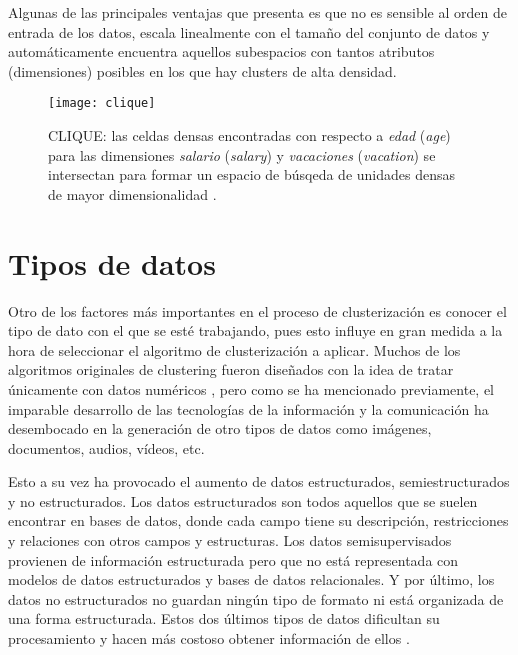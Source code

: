 \documentclass[10pt, a4paper]{article}
\begin{document}
Algunas de las principales ventajas que presenta es que no es sensible al orden de entrada de los datos, escala linealmente con el tamaño del conjunto de datos y automáticamente encuentra aquellos subespacios con tantos atributos (dimensiones) posibles en los que hay clusters de alta densidad.


\begin{figure}[ht]
\centering
\texttt{[image: clique]}
\caption{CLIQUE: las celdas densas encontradas con respecto a \textit{edad} (\textit{age}) para las dimensiones \textit{salario} (\textit{salary}) y \textit{vacaciones} (\textit{vacation}) se intersectan para formar un espacio de búsqeda de unidades densas de mayor dimensionalidad \cite{LIBRO}.}
\label{fig:clique}
\end{figure}



\section{Tipos de datos} \label{sec:tipos de datos}

Otro de los factores más importantes en el proceso de clusterización es conocer el tipo de dato con el que se esté trabajando, pues esto influye en gran medida a la hora de seleccionar el algoritmo de clusterización a aplicar. Muchos de los algoritmos originales de clustering fueron diseñados con la idea de tratar únicamente con datos numéricos \cite{otrolibro}, pero como se ha mencionado previamente, el imparable desarrollo de las tecnologías de la información y la comunicación ha desembocado en la generación de otro tipos de datos como imágenes, documentos, audios, vídeos, etc. 

Esto a su vez ha provocado el aumento de datos estructurados, semiestructurados y no estructurados. Los datos estructurados son todos aquellos que se suelen encontrar en bases de datos, donde cada campo tiene su descripción, restricciones y relaciones con otros campos y estructuras. Los datos semisupervisados provienen de información estructurada pero que no está representada con modelos de datos estructurados y bases de datos relacionales. Y por último, los datos no estructurados no guardan ningún tipo de formato ni está organizada de una forma estructurada. Estos dos últimos tipos de datos dificultan su procesamiento y hacen más costoso obtener información de ellos \cite{articulo14}.
\end{document}
